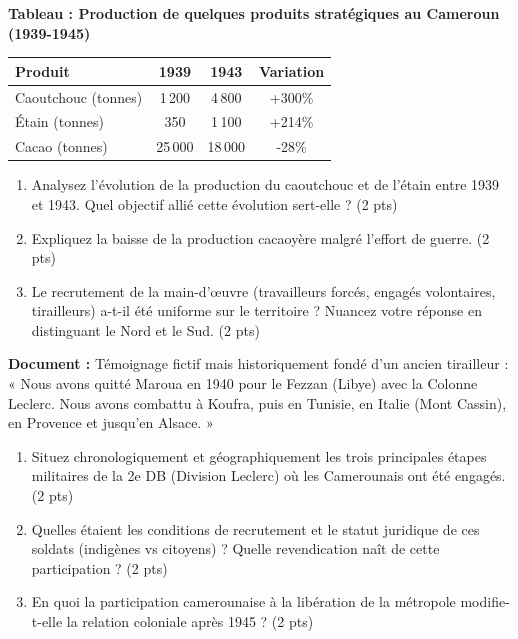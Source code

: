 \documentclass[11pt]{article}
\begin{document}
\begin{exercice}
\textbf{Tableau : Production de quelques produits stratégiques au Cameroun (1939-1945)}
\begin{tabular}{|l|c|c|c|}
\hline
Produit & 1939 & 1943 & Variation \\ \hline
Caoutchouc (tonnes) & 1\,200 & 4\,800 & +300\% \\ \hline
Étain (tonnes) & 350 & 1\,100 & +214\% \\ \hline
Cacao (tonnes) & 25\,000 & 18\,000 & -28\% \\ \hline
\hline
\end{tabular}
\begin{enumerate}
    \item Analysez l'évolution de la production du caoutchouc et de l'étain entre 1939 et 1943. Quel objectif allié cette évolution sert-elle ? (2 pts)
    \item Expliquez la baisse de la production cacaoyère malgré l'effort de guerre. (2 pts)
    \item Le recrutement de la main-d'œuvre (travailleurs forcés, engagés volontaires, tirailleurs) a-t-il été uniforme sur le territoire ? Nuancez votre réponse en distinguant le Nord et le Sud. (2 pts)
\end{enumerate}
\end{exercice}

\begin{exercice}
\textbf{Document :} Témoignage fictif mais historiquement fondé d'un ancien tirailleur : « Nous avons quitté Maroua en 1940 pour le Fezzan (Libye) avec la Colonne Leclerc. Nous avons combattu à Koufra, puis en Tunisie, en Italie (Mont Cassin), en Provence et jusqu'en Alsace. »
\begin{enumerate}
    \item Situez chronologiquement et géographiquement les trois principales étapes militaires de la 2e DB (Division Leclerc) où les Camerounais ont été engagés. (2 pts)
    \item Quelles étaient les conditions de recrutement et le statut juridique de ces soldats (indigènes vs citoyens) ? Quelle revendication naît de cette participation ? (2 pts)
    \item En quoi la participation camerounaise à la libération de la métropole modifie-t-elle la relation coloniale après 1945 ? (2 pts)
\end{enumerate}
\end{exercice}
\end{document}
